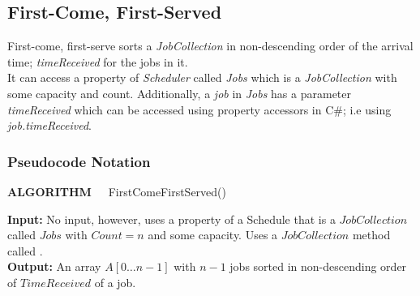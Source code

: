 \documentclass[a4paper]{article}
\begin{document}
\subsection{First-Come, First-Served}
First-come, first-serve sorts a \textit{JobCollection} in non-descending order of the arrival time; \textit{timeReceived} for the jobs in it.
\\[6pt]
It can access a property of \textit{Scheduler} called \textit{Jobs} which is a \textit{JobCollection} with some capacity and count. Additionally, a \textit{job} in \textit{Jobs} has a parameter \textit{timeReceived} which can be accessed using property accessors in C\#; i.e using \textit{job.timeReceived}. 

\subsubsection{Pseudocode Notation}
\begin{algorithm}
   \caption*{\textbf{ALGORITHM~~}  FirstComeFirstServed{()}}
   \textbf{Input:} No input, however, uses a property of a Schedule that is a $JobCollection$ called $Jobs$ with $Count=n$ and some capacity. Uses a $JobCollection$ method called . \\
   \textbf{Output:} An array $A[0\ldots n-1]$ with $n-1$ jobs sorted in non-descending order of $TimeReceived$ of a job.

   \begin{algorithmic}[1]

               \EndIf{}
           \EndFor{}
       \EndFor{}

   \end{algorithmic}
\end{algorithm}
\pagebreak
\end{document}

